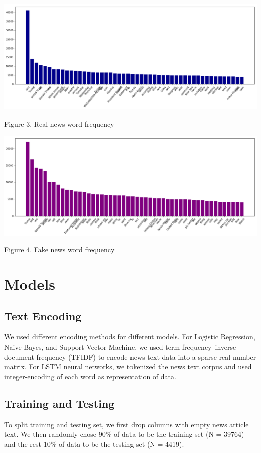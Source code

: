 \documentclass{article}
\begin{document}
\begin{multicols}{2}
\begin{center}
\includegraphics[scale=0.26]{images/freqreal.png}
\newline
\caption{Figure 3. Real news word frequency}
\end{center}
\begin{center}
\includegraphics[scale=0.26]{images/freqfake.png}
\newline
\caption{Figure 4. Fake news word frequency}
\end{center}

\section{Models}
\subsection{Text Encoding}
We used different encoding methods for different models. 
For Logistic Regression, Naive Bayes, and Support Vector Machine, we used term frequency–inverse document frequency (TFIDF) to encode news text data into a sparse real-number matrix. For LSTM neural networks, we tokenized the news text corpus and used integer-encoding of each word as representation of data.

\subsection{Training and Testing}
To split training and testing set, we first drop columns with empty news article text. We then randomly chose 90\% of data to be the training set (N = 39764) and the rest 10\% of data to be the testing set (N = 4419).


\end{multicols}
\end{document}
